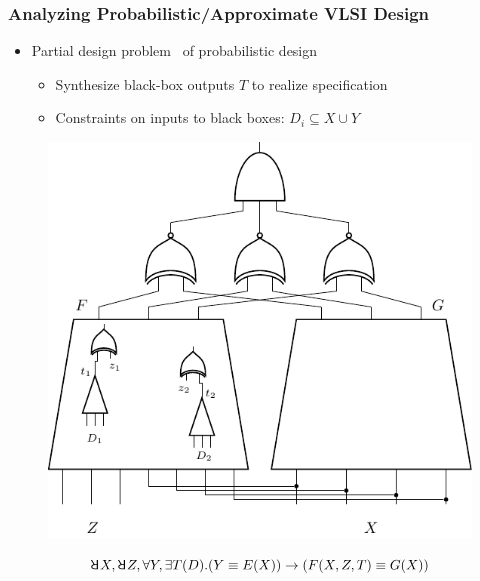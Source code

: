 \begin{frame}
  \frametitle{Analyzing Probabilistic/Approximate VLSI Design}
  \begin{itemize}
    \item Partial design problem~\cite{Gitina2013} of probabilistic design
          \pause
          \begin{itemize}
            \item Synthesize black-box outputs $T$ to realize specification
                  \pause
            \item \alert{Constraints on inputs} to black boxes: $D_i \subseteq X \cup Y$
          \end{itemize}
  \end{itemize}
  \pause
  \begin{figure}
    \centering
    \includegraphics[scale=0.5]{fig/dssat-prob-miter.pdf}
  \end{figure}
  \pause
  \begin{equation*}
    \random{} X,\random{} Z,\forall Y,\exists T(D).
    (Y \equiv E(X)) \limply (F(X,Z,T) \equiv G(X))
  \end{equation*}
\end{frame}